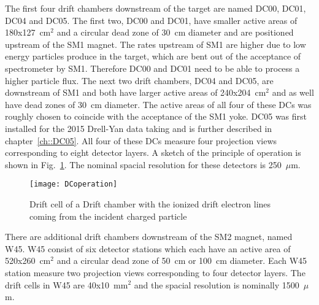 The first four drift chambers downstream of the target are named DC00, DC01,
DC04 and DC05.  The first two, DC00 and DC01, have smaller active areas of
180x127~cm$^2$ and a circular dead zone of 30~cm diameter and are positioned
upstream of the SM1 magnet.  The rates upstream of SM1 are higher due to low
energy particles produce in the target, which are bent out of the acceptance of
spectrometer by SM1.  Therefore DC00 and DC01 need to be able to process a
higher particle flux.  The next two drift chambers, DC04 and DC05, are
downstream of SM1 and both have larger active areas of 240x204~cm$^2$ and as
well have dead zones of 30~cm diameter.  The active areas of all four of these
DCs was roughly chosen to coincide with the acceptance of the SM1 yoke.  DC05
was first installed for the 2015 Drell-Yan data taking and is further described
in chapter~\ref{ch::DC05}.  All four of these DCs measure four projection views
corresponding to eight detector layers.  A sketch of the principle of operation
is shown in Fig.~\ref{fig::DCoperation}.  The nominal spacial resolution for
these detectors is 250~$\mu$m. \par

\begin{figure}[h!t]
  \centering
  \texttt{[image: DCoperation]}
  \caption{Drift cell of a Drift chamber with the ionized drift electron lines
    coming from the incident charged particle}
  \label{fig::DCoperation}
\end{figure}

There are additional drift chambers downstream of the SM2 magnet, named W45.
W45 consist of six detector stations which each have an active area of
520x260~cm$^2$ and a circular dead zone of 50~cm or 100~cm diameter.  Each W45
station measure two projection views corresponding to four detector layers.  The
drift cells in W45 are 40x10~mm$^2$ and the spacial resolution is nominally
1500~$\mu$m. \par


